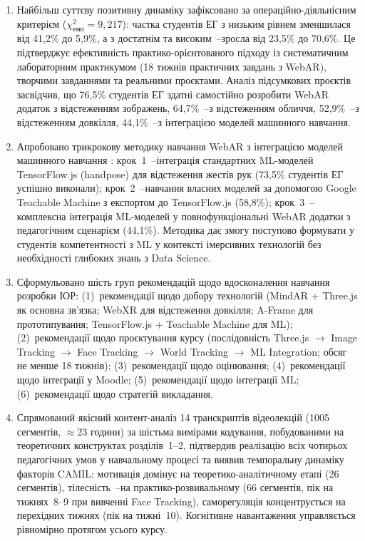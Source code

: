 \begin{enumerate}
\item Найбільш суттєву позитивну динаміку зафіксовано за операційно-діяльнісним критерієм ($\chi^2_{\text{емп}} = 9{,}217$): частка студентів ЕГ з низьким рівнем зменшилася від 41,2\% до 5,9\%, а з достатнім та високим~--зросла від 23,5\% до 70,6\%. Це підтверджує ефективність практико-орієнтованого підходу із систематичним лабораторним практикумом (18 тижнів практичних завдань з WebAR), творчими завданнями та реальними проєктами. Аналіз підсумкових проєктів засвідчив, що 76,5\% студентів ЕГ здатні самостійно розробити WebAR додаток з відстеженням зображень, 64,7\%~--з відстеженням обличчя, 52,9\%~--з відстеженням довкілля, 44,1\%~--з інтеграцією моделей машинного навчання.

\item Апробовано трикрокову методику навчання WebAR з інтеграцією моделей машинного навчання \cite{Semerikov2024WebARML_CoSinE, Semerikov2024WebAR_EduDim}: крок~1~--інтеграція стандартних ML-моделей TensorFlow.js (handpose) для відстеження жестів рук (73,5\% студентів ЕГ успішно виконали); крок~2~--навчання власних моделей за допомогою Google Teachable Machine з експортом до TensorFlow.js (58,8\%); крок~3~--комплексна інтеграція ML-моделей у повнофункціональні WebAR додатки з педагогічним сценарієм (44,1\%). Методика дає змогу поступово формувати у студентів компетентності з ML у контексті імерсивних технологій без необхідності глибоких знань з Data Science.

\item Сформульовано шість груп рекомендацій щодо вдосконалення навчання розробки ІОР: (1)~рекомендації щодо добору технологій (MindAR + Three.js як основна зв'язка; WebXR для відстеження довкілля; A-Frame для прототипування; TensorFlow.js + Teachable Machine для ML); (2)~рекомендації щодо проєктування курсу (послідовність Three.js $\to$ Image Tracking $\to$ Face Tracking $\to$ World Tracking $\to$ ML Integration; обсяг не менше 18 тижнів); (3)~рекомендації щодо оцінювання; (4)~рекомендації щодо інтеграції у Moodle; (5)~рекомендації щодо інтеграції ML; (6)~рекомендації щодо стратегій викладання.

\item Спрямований якісний контент-аналіз 14 транскриптів відеолекцій (1005 сегментів, $\approx$23 години) за шістьма вимірами кодування, побудованими на теоретичних конструктах розділів~1--2, підтвердив реалізацію всіх чотирьох педагогічних умов у навчальному процесі та виявив темпоральну динаміку факторів CAMIL: мотивація домінує на теоретико-аналітичному етапі (26 сегментів), тілесність~--на практико-розвивальному (66 сегментів, пік на тижнях~8--9 при вивченні Face Tracking), саморегуляція концентрується на перехідних тижнях (пік на тижні~10). Когнітивне навантаження управляється рівномірно протягом усього курсу.


\end{enumerate}
